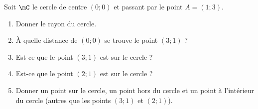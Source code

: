 
\begin{exercice}\label{exoSeconde-0079}

Soit \( \mC\) le cercle de centre \( (0;0)\) et passant par le point \( A=(1;3)\).
\begin{multicols}{2}
    \begin{enumerate}
        \item
            Donner le rayon du cercle.
        \item
            À quelle distance de \( (0;0)\) se trouve le point \( (3;1)\) ?
        \item
            Est-ce que le point \( (3;1)\) est sur le cercle ?
        \item
            Est-ce que le point \( (2;1)\) est sur le cercle ?
        \item
            Donner un point sur le cercle, un point hors du cercle et un point à l'intérieur du cercle (autres que les points \( (3;1)\) et \( (2;1)\)).
    \end{enumerate}
\end{multicols}

\end{exercice}
